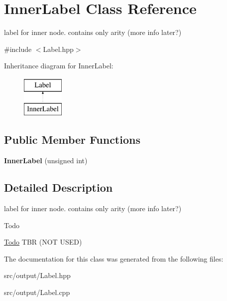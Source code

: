 \hypertarget{classInnerLabel}{}\section{Inner\+Label Class Reference}
\label{classInnerLabel}


label for inner node. contains only arity (more info later?)  




{\ttfamily \#include $<$Label.\+hpp$>$}

Inheritance diagram for Inner\+Label\+:\begin{figure}[H]
\begin{center}
\leavevmode
\includegraphics[height=2.000000cm]{classInnerLabel}
\end{center}
\end{figure}
\subsection*{Public Member Functions}
\begin{DoxyCompactItemize}
\item 
{\bfseries Inner\+Label} (unsigned int)
\end{DoxyCompactItemize}


\subsection{Detailed Description}
label for inner node. contains only arity (more info later?) 

\begin{DoxyRefDesc}{Todo}
\item[\mbox{\hyperlink{todo__todo000013}{Todo}}]T\+BR (N\+OT U\+S\+ED) \end{DoxyRefDesc}


The documentation for this class was generated from the following files\+:\begin{DoxyCompactItemize}
\item 
src/output/Label.\+hpp\item 
src/output/Label.\+cpp\end{DoxyCompactItemize}
